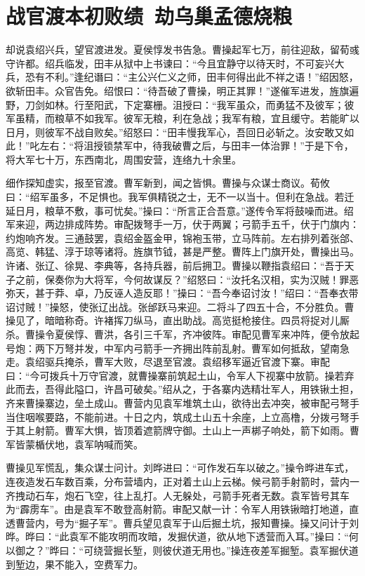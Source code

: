 \chapter{战官渡本初败绩~劫乌巢孟德烧粮}

却说袁绍兴兵，望官渡进发。夏侯惇发书告急。曹操起军七万，前往迎敌，留荀彧守许都。绍兵临发，田丰从狱中上书谏曰：“今且宜静守以待天时，不可妄兴大兵，恐有不利。”逢纪谮曰：“主公兴仁义之师，田丰何得出此不祥之语！”绍因怒，欲斩田丰。众官告免。绍恨曰：“待吾破了曹操，明正其罪！”遂催军进发，旌旗遍野，刀剑如林。行至阳武，下定寨栅。沮授曰：“我军虽众，而勇猛不及彼军；彼军虽精，而粮草不如我军。彼军无粮，利在急战；我军有粮，宜且缓守。若能旷以日月，则彼军不战自败矣。”绍怒曰：“田丰慢我军心，吾回日必斩之。汝安敢又如此！”叱左右：“将沮授锁禁军中，待我破曹之后，与田丰一体治罪！”于是下令，将大军七十万，东西南北，周围安营，连络九十余里。

细作探知虚实，报至官渡。曹军新到，闻之皆惧。曹操与众谋士商议。荀攸曰：“绍军虽多，不足惧也。我军俱精锐之士，无不一以当十。但利在急战。若迁延日月，粮草不敷，事可忧矣。”操曰：“所言正合吾意。”遂传令军将鼓噪而进。绍军来迎，两边排成阵势。审配拨弩手一万，伏于两翼；弓箭手五千，伏于门旗内：约炮响齐发。三通鼓罢，袁绍金盔金甲，锦袍玉带，立马阵前。左右排列着张郃、高览、韩猛、淳于琼等诸将。旌旗节钺，甚是严整。曹阵上门旗开处，曹操出马。许诸、张辽、徐晃、李典等，各持兵器，前后拥卫。曹操以鞭指袁绍曰：“吾于天子之前，保奏你为大将军，今何故谋反？”绍怒曰：“汝托名汉相，实为汉贼！罪恶弥天，甚于莽、卓，乃反诬人造反耶！”操曰：“吾今奉诏讨汝！”绍曰：“吾奉衣带诏讨贼！”操怒，使张辽出战。张邰跃马来迎。二将斗了四五十合，不分胜负。曹操见了，暗暗称奇。许褚挥刀纵马，直出助战。高览挺枪接住。四员将捉对儿厮杀。曹操令夏侯惇、曹洪，各引三千军，齐冲彼阵。审配见曹军来冲阵，便令放起号炮：两下万弩并发，中军内弓箭手一齐拥出阵前乱射。曹军如何抵敌，望南急走。袁绍驱兵掩杀，曹军大败，尽退至官渡。袁绍移军逼近官渡下寨。审配曰：“今可拨兵十万守官渡，就曹操寨前筑起土山，令军人下视寨中放箭。操若弃此而去，吾得此隘口，许昌可破矣。”绍从之，于各寨内选精壮军人，用铁锹土担，齐来曹操寨边，垒土成山。曹营内见袁军堆筑土山，欲待出去冲突，被审配弓弩手当住咽喉要路，不能前进。十日之内，筑成土山五十余座，上立高橹，分拨弓弩手于其上射箭。曹军大惧，皆顶着遮箭牌守御。土山上一声梆子响处，箭下如雨。曹军皆蒙楯伏地，袁军呐喊而笑。

曹操见军慌乱，集众谋士问计。刘晔进曰：“可作发石车以破之。”操令晔进车式，连夜造发石车数百乘，分布营墙内，正对着土山上云梯。候弓箭手射箭时，营内一齐拽动石车，炮石飞空，往上乱打。人无躲处，弓箭手死者无数。袁军皆号其车为“霹雳车”。由是袁军不敢登高射箭。审配又献一计：令军人用铁锹暗打地道，直透曹营内，号为“掘子军”。曹兵望见袁军于山后掘土坑，报知曹操。操又问计于刘晔。晔曰：“此袁军不能攻明而攻暗，发掘伏道，欲从地下透营而入耳。”操曰：“何以御之？”晔曰：“可绕营掘长堑，则彼伏道无用也。”操连夜差军掘堑。袁军掘伏道到堑边，果不能入，空费军力。

